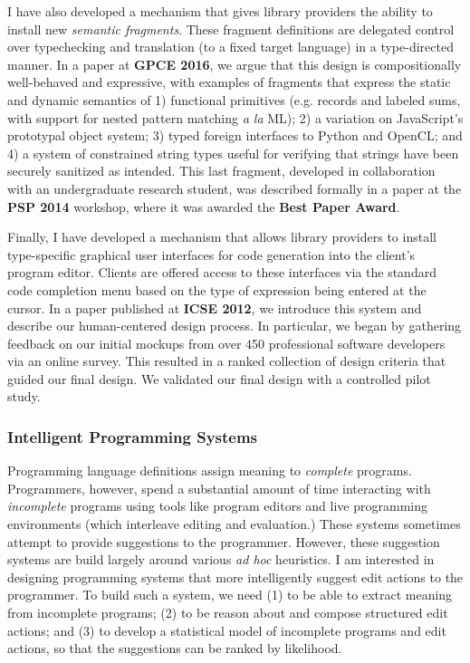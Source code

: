 \documentclass[10pt]{article}
\let\li\lstinline
\begin{document}
I have also developed a mechanism that gives library providers the ability to install new \emph{semantic fragments}. These fragment definitions are delegated control over typechecking and translation (to a fixed target language) in a type-directed manner. In a paper at \textbf{GPCE 2016}, we argue that this design is compositionally well-behaved and expressive, with examples of
fragments that express the static and dynamic semantics of
1) functional primitives (e.g. records and labeled sums, with support for nested pattern
matching \emph{a la} ML); 2) a variation on JavaScript's prototypal
object system; 3) typed foreign interfaces to Python and
OpenCL; and 4) a system of constrained string types useful for verifying that strings have been securely sanitized as intended. This last fragment, developed in collaboration with an undergraduate research student, was described formally in a paper at the \textbf{PSP 2014} workshop, where it was awarded the \textbf{Best Paper Award}. %

Finally, I have developed a mechanism that allows library providers to install type-specific {graphical user interfaces} for code generation into the client's program editor. Clients are offered access to these interfaces via the standard code completion menu based on the type of expression being entered at the cursor. In a paper published at \textbf{ICSE 2012}, we introduce this system and describe our human-centered design process. In particular, we began by gathering feedback on our initial mockups from over 450 professional software developers via an online survey. This resulted in a ranked collection of design criteria that guided our final design. We validated our final design with a controlled pilot study.

\subsubsection*{Intelligent Programming Systems}
Programming language definitions assign meaning to \emph{complete} programs. 
Programmers, however, spend a substantial amount of time interacting with \emph{incomplete} programs using tools like program editors and live programming environments (which interleave editing and evaluation.) These systems sometimes attempt to provide suggestions to the programmer. However, these suggestion systems are build largely around various \emph{ad hoc} heuristics. I am interested in designing programming systems that more intelligently suggest edit actions to the programmer. To build such a system, we need (1) to be able to extract meaning from incomplete programs; (2) to be reason about and compose structured edit actions; and (3) to develop a statistical model of incomplete programs and edit actions, so that the suggestions can be ranked by likelihood.
\end{document}
